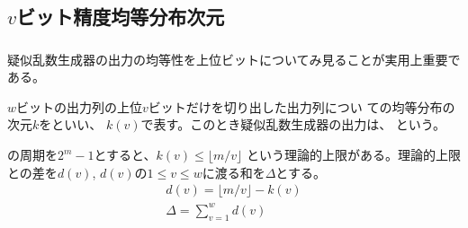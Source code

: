\documentclass[cjk, dvips, xcolor=dvipsnames, hyperref={bookmarks=false}]{beamer}
\begin{document}
\subsection{$v$ビット精度均等分布次元}
\begin{frame}[t]
  \frametitle{\insertsubsection}

  疑似乱数生成器の出力の均等性を上位ビットについてみ見ることが実用上重要である。


  \pause
  \vspace{\baselineskip}
  $w$ビットの出力列の上位$v$ビットだけを切り出した出力列につい
  ての均等分布の次元$k$をといい、
  $k(v)$で表す。このとき疑似乱数生成器の出力は、
  という。

  \pause
  \vspace{\baselineskip}
  \FLPRNG の周期を$2^m-1$とすると、$k(v) \le \lfloor m/v \rfloor$
  という理論的上限がある。理論的上限との差を$d(v)$,
  $d(v)$の$1 \le v \le w$に渡る和を$\Delta$とする。
  \begin{gather*}
    d(v) = \lfloor m/v \rfloor - k(v)\\
    \Delta = \sum_{v = 1}^w d(v)
  \end{gather*}
\end{frame}
\end{document}
